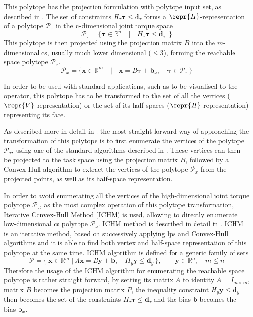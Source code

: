 This polytope has the projection formulation with polytope input set, as described in . The set of constraints $H_\tau\bm{\tau}\leq\bm{d}_\tau$ forms a $\repr{H}$-representation of a polytope $\mathcal{P}_\tau$ in the $n$-dimensional joint torque space
\begin{equation}
    \mathcal{P}_\tau = \{ \bm{\tau} \in \mathbb{R}^n \quad| \quad H_\tau\bm{\tau}\leq \bm{d}_\tau ~~\}
\label{eq:polytope_torque}
\end{equation}
This polytope is then projected using the projection matrix $B$ into the $m$-dimensional \gls{cs}, usually much lower dimensional ($\leq3$), forming the reachable space polytope $\mathcal{P}_x$.
\begin{equation}
    \mathcal{P}_x = \{ \bm{x} \in \mathbb{R}^m \quad| \quad \bm{x}=B\bm{\tau} + \bm{b}_x, \quad \bm{\tau} \in \mathcal{P}_\tau ~\}
\label{eq:polytope_projection}
\end{equation}

In order to be used with standard applications, such as to be visualised to the operator, this polytope has to be transformed to the set of all the vertices ($\repr{V}$-representation) or the set of its half-spaces ($\repr{H}$-representation) representing its face.

As described more in detail in , the most straight forward way of approaching the transformation of this polytope is to first enumerate the vertices of the polytope $\mathcal{P}_\tau$, using one of the standard algorithms described in . These vertices can then be projected to the task space using the projection matrix $B$, followed by a Convex-Hull algorithm to extract the vertices of the polytope $\mathcal{P}_x$ from the projected points, as well as its half-space representation.

In order to avoid enumerating all the vertices of the high-dimensional joint torque polytope $\mathcal{P}_\tau$, as the most complex operation of this polytope transformation, Iterative Convex-Hull Method (ICHM) is used, allowing to directly enumerate low-dimensional \gls{cs} polytope $\mathcal{P}_x$. ICHM method is described in detail in . ICHM is an iterative method, based on successively applying \glspl{lp} and Convex-Hull algorithms and it is able to find both vertex and half-space representation of this polytope at the same time. ICHM algorithm is defined for a generic family of sets
\begin{equation}
\mathcal{P} = \{ ~\bm{x}\in \mathbb{R}^{m} ~|~ A\bm{x} = B\bm{y} + \bm{b},\quad H_y\bm{y} \leq \bm{d}_y~\}, \qquad \bm{y} \in \mathbb{R}^n,\quad m \leq n
\end{equation}
Therefore the usage of the ICHM algorithm for enumerating the reachable space polytope is rather straight forward, by setting its matrix $A$ to identity $A=I_{m \times m}$, matrix $B$ becomes the projection matrix $P$, the inequality constraint $H_y\bm{y} \leq \bm{d}_y$ then becomes the set of the constraints $H_\tau\bm{\tau}\leq\bm{d}_\tau$ and the bias $\bm{b}$ becomes the bias $\bm{b}_x$.



